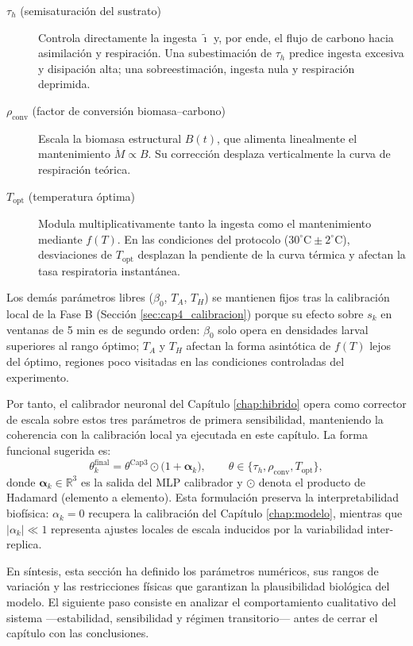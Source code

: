 \begin{description}
    \item[$\tau_h$ (semisaturación del sustrato)] Controla directamente la ingesta $\tilde{\imath}$ y, por ende, el flujo de carbono hacia asimilación y respiración. Una subestimación de $\tau_h$ predice ingesta excesiva y disipación alta; una sobreestimación, ingesta nula y respiración deprimida.
    
    \item[$\rho_{\mathrm{conv}}$ (factor de conversión biomasa--carbono)] Escala la biomasa estructural $B(t)$, que alimenta linealmente el mantenimiento $\dot{M} \propto B$. Su corrección desplaza verticalmente la curva de respiración teórica.
    
    \item[$T_{\mathrm{opt}}$ (temperatura óptima)] Modula multiplicativamente tanto la ingesta como el mantenimiento mediante $f(T)$. En las condiciones del protocolo ($30^\circ\mathrm{C} \pm 2^\circ\mathrm{C}$), desviaciones de $T_{\mathrm{opt}}$ desplazan la pendiente de la curva térmica y afectan la tasa respiratoria instantánea.
\end{description}

Los demás parámetros libres ($\beta_0$, $T_A$, $T_H$) se mantienen fijos tras la calibración local de la Fase B (Sección \ref{sec:cap4_calibracion}) porque su efecto sobre $s_k$ en ventanas de 5 min es de segundo orden: $\beta_0$ solo opera en densidades larval superiores al rango óptimo; $T_A$ y $T_H$ afectan la forma asintótica de $f(T)$ lejos del óptimo, regiones poco visitadas en las condiciones controladas del experimento.

Por tanto, el calibrador neuronal del Capítulo \ref{chap:hibrido} opera como corrector de escala sobre estos tres parámetros de primera sensibilidad, manteniendo la coherencia con la calibración local ya ejecutada en este capítulo. La forma funcional sugerida es:
\begin{equation}
    \theta_k^{\mathrm{final}} = \theta^{\mathrm{Cap3}} \odot \bigl(1 + \boldsymbol{\alpha}_k\bigr), \qquad \theta \in \{\tau_h, \rho_{\mathrm{conv}}, T_{\mathrm{opt}}\},
    \label{eq:cap3_correccion_escala}
\end{equation}
donde $\boldsymbol{\alpha}_k \in \mathbb{R}^3$ es la salida del MLP calibrador y $\odot$ denota el producto de Hadamard (elemento a elemento). Esta formulación preserva la interpretabilidad biofísica: $\alpha_k = 0$ recupera la calibración del Capítulo \ref{chap:modelo}, mientras que $|\alpha_k| \ll 1$ representa ajustes locales de escala inducidos por la variabilidad inter-replica.

En síntesis, esta sección ha definido los parámetros numéricos, sus rangos de variación y las restricciones físicas que garantizan la plausibilidad biológica del modelo. El siguiente paso consiste en analizar el comportamiento cualitativo del sistema —estabilidad, sensibilidad y régimen transitorio— antes de cerrar el capítulo con las conclusiones.
